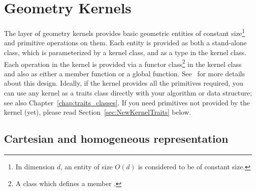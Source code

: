 
\chapter{Geometry Kernels} \label{chap:kernels}


The layer of geometry kernels provides
basic geometric entities of constant size\footnote{In dimension $d$,
an entity of size $O(d)$ is considered to be of constant size.} and
primitive operations on them. Each entity is provided as both a
stand-alone class, which is parameterized by a kernel class, and as a
type in the kernel class. Each operation in the kernel is provided via
a functor class\footnote{A class which defines a member
.} in the  kernel
class and also as either a member function or a global function.
See~\cite{hhkps-aegk-01} for more details about this design.
% 
% 
Ideally, if the kernel provides all the primitives required, you can
use any kernel as a traits class directly with your algorithm or data
structure; see also Chapter~\ref{chap:traits_classes}. If you need
primitives not provided by the kernel (yet), please read
Section~\ref{sec:NewKernelTraits} below.

\section{Cartesian and homogeneous representation}
\label{sec:cart_and_hom_representation}

